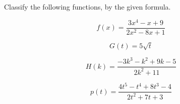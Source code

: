 \documentclass{ximera}
\author{Lee Wayand}
\begin{document}
\begin{example}




Classify the following functions, by the given formula.



\begin{question}


\[
f(x) = \frac{3x^4 - x + 9}{2x^2 - 8x + 1}
\]

\begin{multipleChoice}
\end{multipleChoice}


\end{question}











\begin{question}


\[
G(t) = 5 \sqrt{t}
\]

\begin{multipleChoice}
\end{multipleChoice}


\end{question}







\begin{question}


\[
H(k) = \frac{-3k^3 - k^2 + 9k - 5}{2k^2 + 11}
\]

\begin{multipleChoice}
\end{multipleChoice}


\end{question}








\begin{question}


\[
p(t) = \frac{4t^5 - t^4 + 8t^3 - 4}{2t^2 + 7t + 3}
\]

\begin{multipleChoice}
\end{multipleChoice}



\end{question}
\end{example}
\end{document}
